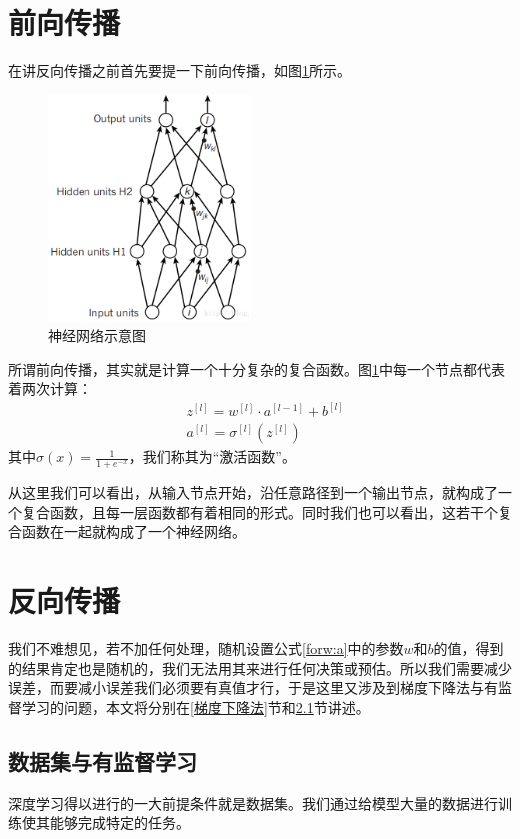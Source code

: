 \documentclass[UTF8,a4paper]{ctexart}
\begin{document}
\begin{multicols}{2}
		\section{前向传播}\label{forward}
		
		\indent 在讲反向传播之前首先要提一下前向传播，如图\ref{neuralNetWork}所示。
		
		\begin{figure}[H]
			\includegraphics[width=1\linewidth,height=6cm]{20171216112534046.png}
			\caption{神经网络示意图}
			\label{neuralNetWork}
		\end{figure}
			
		\indent 所谓前向传播，其实就是计算一个十分复杂的复合函数。图\ref{neuralNetWork}中每一个节点都代表着两次计算：
		\begin{align}
			&{z}^{[l]}={w}^{[l]}\cdot{a}^{[l-1]}+{b}^{[l]} \label{forw:z} \\
			&{{a}^{[l]}}={{\sigma}^{[l]}}\left({{z}^{[l]}}\right) \label{forw:a}
		\end{align}
		其中$\sigma(x)=\frac{1}{1+e^{-x}}$，我们称其为“激活函数”。
		
		\indent 从这里我们可以看出，从输入节点开始，沿任意路径到一个输出节点，就构成了一个复合函数，且每一层函数都有着相同的形式。同时我们也可以看出，这若干个复合函数在一起就构成了一个神经网络。
		
		\section{反向传播}\label{backward}
		
		\indent 我们不难想见，若不加任何处理，随机设置公式\ref{forw:a}中的参数$w$和$b$的值，得到的结果肯定也是随机的，我们无法用其来进行任何决策或预估。所以我们需要减少误差，而要减小误差我们必须要有真值才行，于是这里又涉及到梯度下降法与有监督学习的问题，本文将分别在\ref{梯度下降法}节和\ref{datasets}节讲述。
		
		
		\subsection{数据集与有监督学习}\label{datasets}
			\indent 深度学习得以进行的一大前提条件就是数据集。我们通过给模型大量的数据进行训练使其能够完成特定的任务。
			

\end{multicols}
\end{document}
